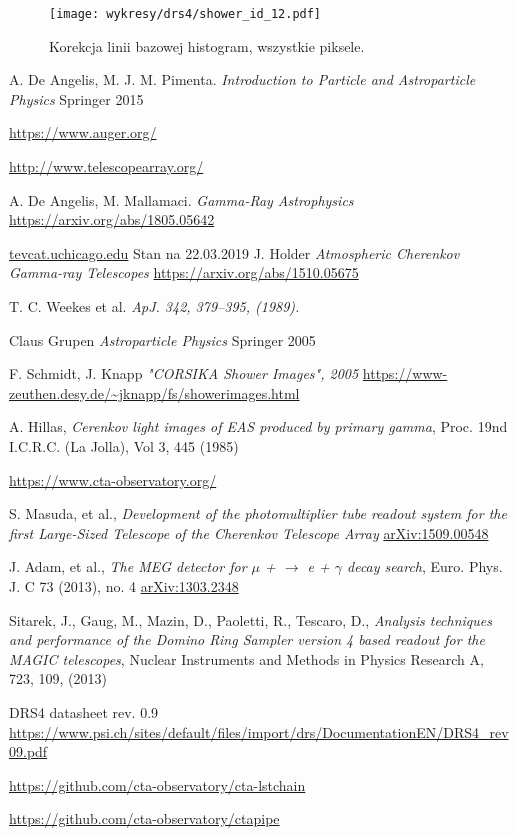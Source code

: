\documentclass[a4paper,11pt,twoside]{article}
\begin{document}
\begin{figure}[H] 
\centering
\texttt{[image: wykresy/drs4/shower\_id\_12.pdf]}
\caption{Korekcja linii bazowej histogram, wszystkie piksele.}
\label{fig:muon_image}
\end{figure}
\newpage
\begin{thebibliography}{9}
A. De Angelis, M. J. M. Pimenta.
\textit{Introduction to Particle and Astroparticle Physics} Springer 2015

\url{https://www.auger.org/}

\url{http://www.telescopearray.org/}

A. De Angelis, M. Mallamaci.
\textit{Gamma-Ray Astrophysics} 
\url{https://arxiv.org/abs/1805.05642}

\url{tevcat.uchicago.edu}
Stan na 22.03.2019
J. Holder
\textit{Atmospheric Cherenkov Gamma-ray Telescopes}
\url{https://arxiv.org/abs/1510.05675}

T. C. Weekes et al.
\textit{ApJ. 342, 379–395, (1989).}

Claus Grupen
\textit{Astroparticle Physics} Springer 2005

F. Schmidt, J. Knapp
\textit{"CORSIKA Shower Images", 2005}
\url{https://www-zeuthen.desy.de/~jknapp/fs/showerimages.html}

A. Hillas, 
\textit{Cerenkov light images of EAS produced by primary gamma},
Proc. 19nd I.C.R.C. (La Jolla), Vol 3, 445 (1985)

\url{https://www.cta-observatory.org/}

S. Masuda, et al., 
\textit{Development of the photomultiplier tube readout
system for the first Large-Sized Telescope of the
Cherenkov Telescope Array}
\url{arXiv:1509.00548}

J. Adam, et al.,
\textit{The MEG detector for $\mu$ + $\rightarrow$ e + $\gamma$ decay search}, Euro. Phys. J. C 73 (2013), no. 4
\url{arXiv:1303.2348}

Sitarek, J., Gaug, M., Mazin, D., Paoletti, R., Tescaro, D., \textit{Analysis techniques and performance of the Domino Ring Sampler version 4 based readout for the MAGIC
telescopes}, Nuclear Instruments and Methods in Physics Research A, 723, 109, (2013)

DRS4 datasheet rev. 0.9
\url{https://www.psi.ch/sites/default/files/import/drs/DocumentationEN/DRS4_rev09.pdf}

\url{https://github.com/cta-observatory/cta-lstchain}

\url{https://github.com/cta-observatory/ctapipe}
\end{thebibliography}
\end{document}
